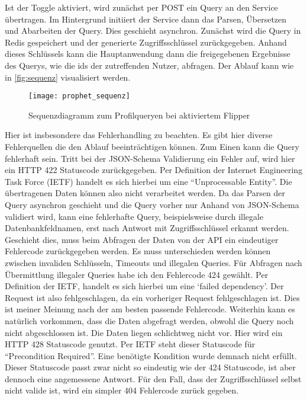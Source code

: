 Ist der Toggle aktiviert, wird zunächst per POST ein Query an den Service übertragen. Im Hintergrund initiiert der Service dann das Parsen, Übersetzen und Abarbeiten der Query. Dies geschieht asynchron. Zunächst wird die Query in Redis gespeichert und der generierte Zugriffsschlüssel zurückgegeben.
Anhand dieses Schlüssels kann die Hauptanwendung dann die freigegebenen Ergebnisse des Querys, wie die ids der zutreffenden Nutzer, abfragen. Der Ablauf kann wie in \autoref{fig:sequenz} visualisiert werden.

\begin{figure}[!ht]
    \centering
    \caption{Sequenzdiagramm zum Profilqueryen bei aktiviertem Flipper}
    \label{fig:sequenz}
    \texttt{[image: prophet\_sequenz]}
\end{figure}

Hier ist insbesondere das Fehlerhandling zu beachten. Es gibt hier diverse Fehlerquellen die den Ablauf beeinträchtigen können. Zum Einen kann die Query fehlerhaft sein. 
Tritt bei der JSON-Schema Validierung ein Fehler auf, wird hier ein HTTP 422 Statuscode zurückgegeben. Per Definition der Internet Engineering Task Force (IETF)\cite{ietf:424} handelt es sich hierbei um eine ``Unprocessable Entity''. Die übertragenen Daten können also nicht verarbeitet werden.
Da das Parsen der Query asynchron geschieht und die Query vorher nur Anhand von JSON-Schema validiert wird, kann eine fehlerhafte Query, beispielsweise durch illegale Datenbankfeldnamen, erst nach Antwort mit Zugriffsschlüssel erkannt werden. Geschieht dies, muss beim Abfragen der Daten von der API ein eindeutiger Fehlercode zurückgegeben werden. Es muss unterschieden werden können zwischen invaliden Schlüsseln, Timeouts und illegalen Queries. Für Abfragen nach Übermittlung illegaler Queries habe ich den Fehlercode 424 gewählt. Per Definition der IETF\cite{ietf:424}, handelt es sich hierbei um eine `failed dependency'. Der Request ist also fehlgeschlagen, da ein vorheriger Request fehlgeschlagen ist. Dies ist meiner Meinung nach der am besten passende Fehlercode.
Weiterhin kann es natürlich vorkommen, dass die Daten abgefragt werden, obwohl die Query noch nicht abgeschlossen ist. Die Daten liegen schlichtweg nicht vor. Hier wird ein HTTP 428 Statuscode genutzt. Per IETF\cite{ietf:428} steht dieser Statuscode für ``Precondition Required''. Eine benötigte Kondition wurde demnach nicht erfüllt. Dieser Statuscode passt zwar nicht so eindeutig wie der 424 Statuscode, ist aber dennoch eine angemessene Antwort.
Für den Fall, dass der Zugriffsschlüssel selbst nicht valide ist, wird ein simpler 404 Fehlercode zurück gegeben.

